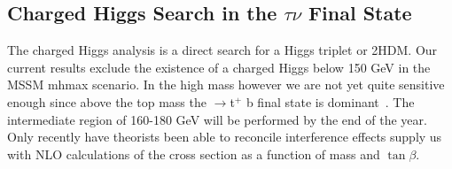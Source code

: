 \documentclass[11pt]{article}
\newcommand{\tanb}{$\tan \beta$}
\newcommand{\too}{$\rightarrow$}
\begin{document}
\subsection{Charged Higgs Search in the $\tau \nu $ Final State}
%
The charged Higgs analysis is a direct search for a Higgs triplet or 2HDM.  Our current results exclude the existence of a charged Higgs below 150 GeV in the MSSM mhmax scenario. In the high mass however we are not yet quite sensitive enough 
since above the top mass the \Hp \too t$^+$ b final state is dominant~\cite{hptnu}. 
The intermediate region of 160-180 GeV will be performed by the end of the year.  Only recently have theorists been able to reconcile \ttbar interference effects supply us with NLO  calculations of the cross section as a function of mass and \tanb.
\end{document}
